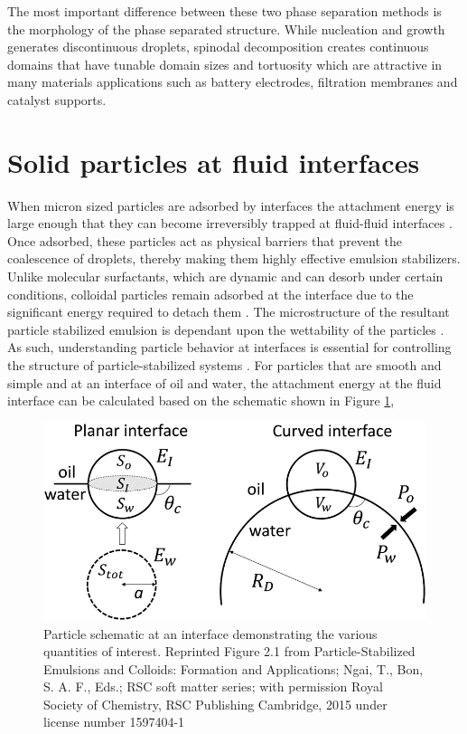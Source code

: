 The most important difference between these two phase separation methods is the morphology of the phase separated structure. While nucleation and growth generates discontinuous droplets,
spinodal decomposition creates continuous domains that have tunable domain sizes and tortuosity which are attractive in many materials applications such as battery electrodes, filtration
membranes and catalyst supports.

\section{Solid particles at fluid interfaces}

When micron sized particles are adsorbed by interfaces the attachment energy is large enough that they can become irreversibly trapped at fluid-fluid interfaces 
\cite{ngai_particle-stabilized_2015}. Once adsorbed, these particles act as physical barriers that prevent the coalescence of droplets, thereby making them highly effective 
emulsion stabilizers. Unlike molecular surfactants, which are dynamic and can desorb under certain conditions, colloidal particles remain adsorbed at the interface due to the 
significant energy required to detach them \cite{ngai_particle-stabilized_2015}. The microstructure of the resultant particle stabilized emulsion is dependant upon the wettability 
of the particles \cite{ngai_particle-stabilized_2015,velankar_non-equilibrium_2015}.
As such, understanding particle behavior at interfaces is essential for controlling the structure of particle-stabilized systems \cite{ngai_particle-stabilized_2015}. 
For particles that are smooth and simple and at an interface of oil and water, the attachment energy at the fluid interface can be calculated based on the schematic shown in 
Figure \ref{fig:pieranski_model},

\begin{figure}
    \centering
    \includegraphics[scale = 0.5]{../figures/literature_review/particle_at_interface.png }
    \caption{Particle schematic at an interface demonstrating the various quantities of interest. Reprinted Figure 2.1 from
             Particle-Stabilized Emulsions and Colloids: Formation and Applications; Ngai, T., Bon, S. A. F., Eds.; RSC soft matter series; 
             with permission Royal Society of Chemistry, RSC Publishing Cambridge, 2015 under license number 1597404-1}
    \label{fig:pieranski_model}
\end{figure}

